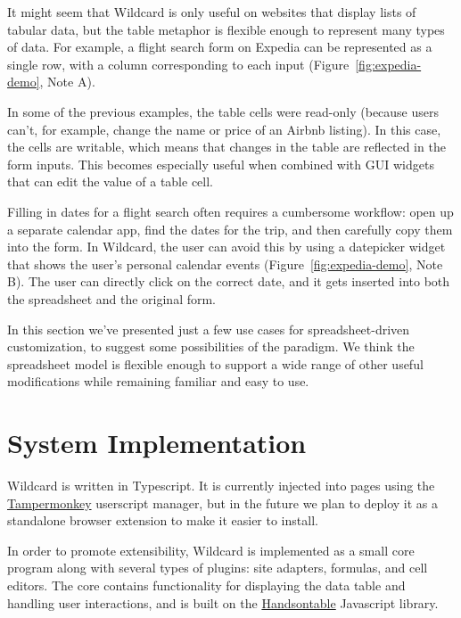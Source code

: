 \documentclass[english]{programming}
\begin{document}
It might seem that Wildcard is only useful on websites that display
lists of tabular data, but the table metaphor is flexible enough to
represent many types of data. For example, a flight search form on
Expedia can be represented as a single row, with a column corresponding
to each input{ (Figure~\ref{fig:expedia-demo}, Note A)}.

In some of the previous examples, the table cells were read-only
(because users can't, for example, change the name or price of an Airbnb
listing). In this case, the cells are writable, which means that changes
in the table are reflected in the form inputs. This becomes especially
useful when combined with GUI widgets that can edit the value of a table
cell.

Filling in dates for a flight search often requires a cumbersome
workflow: open up a separate calendar app, find the dates for the trip,
and then carefully copy them into the form. In Wildcard, the user can
avoid this by using a datepicker widget that shows the user's personal
calendar events{ (Figure~\ref{fig:expedia-demo}, Note B)}. The user can
directly click on the correct date, and it gets inserted into both the
spreadsheet and the original form.

In this section we've presented just a few use cases for
spreadsheet-driven customization, to suggest some possibilities of the
paradigm. We think the spreadsheet model is flexible enough to support a
wide range of other useful modifications while remaining familiar and
easy to use.

\hypertarget{sec:implementation}{%
\section{System Implementation}\label{sec:implementation}}

Wildcard is written in Typescript. It is currently injected into pages
using the \href{https://www.tampermonkey.net/}{Tampermonkey} userscript
manager, but in the future we plan to deploy it as a standalone browser
extension to make it easier to install.

In order to promote extensibility, Wildcard is implemented as a small
core program along with several types of plugins: site adapters,
formulas, and cell editors. The core contains functionality for
displaying the data table and handling user interactions, and is built
on the \href{https://handsontable.com/}{Handsontable} Javascript
library.
\end{document}
